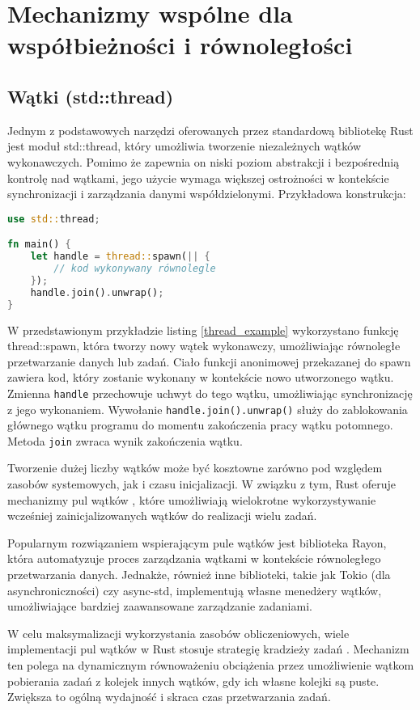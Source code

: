 \section{Mechanizmy wspólne dla współbieżności i równoległości}
\subsection{Wątki (std::thread)}
Jednym z podstawowych narzędzi oferowanych przez standardową bibliotekę Rust jest moduł std::thread, który umożliwia tworzenie niezależnych wątków wykonawczych. Pomimo że zapewnia on niski poziom abstrakcji i bezpośrednią kontrolę nad wątkami, jego użycie wymaga większej ostrożności w kontekście synchronizacji i zarządzania danymi współdzielonymi.
Przykładowa konstrukcja:
\begin{lstlisting}[language=Rust, caption=Przykład tworzenia wątku, label=thread_example]
use std::thread;

fn main() {
    let handle = thread::spawn(|| {
        // kod wykonywany równolegle
    });
    handle.join().unwrap();
}
\end{lstlisting}
W przedstawionym przykładzie listing \ref{thread_example} wykorzystano funkcję thread::spawn, która tworzy nowy wątek wykonawczy, umożliwiając równoległe przetwarzanie danych lub zadań. Ciało funkcji anonimowej przekazanej do spawn zawiera kod, który zostanie wykonany w kontekście nowo utworzonego wątku. Zmienna \texttt{handle} przechowuje uchwyt do tego wątku, umożliwiając synchronizację z jego wykonaniem.
Wywołanie \texttt{handle.join().unwrap()} służy do zablokowania głównego wątku programu do momentu zakończenia pracy wątku potomnego. Metoda \texttt{join} zwraca wynik zakończenia wątku.

Tworzenie dużej liczby wątków może być kosztowne zarówno pod względem zasobów systemowych, jak i czasu inicjalizacji. W związku z tym, Rust oferuje mechanizmy pul wątków , które umożliwiają wielokrotne wykorzystywanie wcześniej zainicjalizowanych wątków do realizacji wielu zadań.

Popularnym rozwiązaniem wspierającym pule wątków jest biblioteka Rayon, która automatyzuje proces zarządzania wątkami w kontekście równoległego przetwarzania danych. Jednakże, również inne biblioteki, takie jak Tokio (dla asynchroniczności) czy async-std, implementują własne menedżery wątków, umożliwiające bardziej zaawansowane zarządzanie zadaniami.

W celu maksymalizacji wykorzystania zasobów obliczeniowych, wiele implementacji pul wątków w Rust stosuje strategię kradzieży zadań . Mechanizm ten polega na dynamicznym równoważeniu obciążenia przez umożliwienie wątkom pobierania zadań z kolejek innych wątków, gdy ich własne kolejki są puste. Zwiększa to ogólną wydajność i skraca czas przetwarzania zadań.

